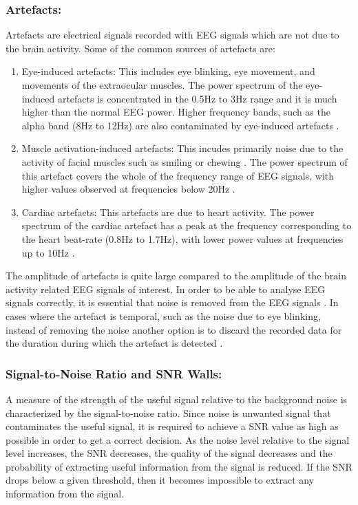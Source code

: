 \subsubsection{\bf{Artefacts:}}
Artefacts are electrical signals recorded with EEG signals which are not due to the brain activity. Some of the common sources of artefacts are: 
\begin{enumerate} [label=\alph*)]
	\item Eye-induced artefacts: This includes eye blinking, eye movement, and movements of the extraocular muscles. The power spectrum of the eye-induced artefacts is concentrated in the 0.5Hz to 3Hz range and it is much higher than the normal EEG power. Higher frequency bands, such as the alpha band (8Hz to 12Hz) are also contaminated by eye-induced artefacts \citep{Manoilov2006, Tamburro2018}. 
	\item Muscle activation-induced artefacts: This incudes primarily noise due to the activity of facial muscles such as smiling or chewing \citep{Yong2008}. The power spectrum of this artefact covers the whole of the frequency range of EEG signals, with higher values observed at frequencies below 20Hz \citep{Tamburro2018}.        
	\item Cardiac artefacts: This artefacts are due to heart activity. The power spectrum of the cardiac artefact has a peak at the frequency corresponding to the heart beat-rate (0.8Hz to 1.7Hz), with lower power values at frequencies up to 10Hz \citep{Tamburro2018}. 
\end{enumerate} 

The amplitude of artefacts is quite large compared to the amplitude of the brain activity related EEG signals of interest. In order to be able to analyse EEG signals correctly, it is essential that noise is removed from the EEG signals \citep{Balbir2017, Fitzgibbon2007, Mantini2008, Delorme2007}.  In cases where the artefact is temporal, such as the noise due to eye blinking, instead of removing the noise another option is to discard the recorded data for the duration during which the artefact is detected \citep{Repovs2010, Jirayucharoensak2013, Mognon2011}.

\subsubsection{\bf{Signal-to-Noise Ratio and SNR Walls:}}
A measure of the strength of the useful signal relative to the background noise is characterized by the signal-to-noise ratio. Since noise is unwanted signal that contaminates the useful signal, it is required to achieve a SNR value as high as possible in order to get a correct decision. As the noise level relative to the signal level increases, the SNR decreases, the quality of the signal decreases and the probability of extracting useful information from the signal is reduced. If the SNR drops below a given threshold, then it becomes impossible to extract any information from the signal.    
   
